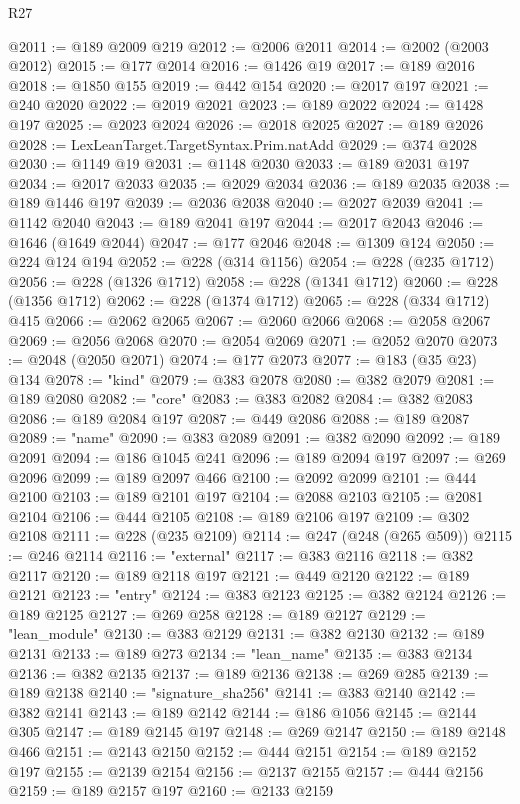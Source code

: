 \begin{lexlean}{R27}
\begin{coremodule}
@2011 := @189 @2009 @219
@2012 := @2006 @2011
@2014 := @2002 (@2003 @2012)
@2015 := @177 @2014
@2016 := @1426 @19
@2017 := @189 @2016
@2018 := @1850 @155
@2019 := @442 @154
@2020 := @2017 @197
@2021 := @240 @2020
@2022 := @2019 @2021
@2023 := @189 @2022
@2024 := @1428 @197
@2025 := @2023 @2024
@2026 := @2018 @2025
@2027 := @189 @2026
@2028 := LexLeanTarget.TargetSyntax.Prim.natAdd
@2029 := @374 @2028
@2030 := @1149 @19
@2031 := @1148 @2030
@2033 := @189 @2031 @197
@2034 := @2017 @2033
@2035 := @2029 @2034
@2036 := @189 @2035
@2038 := @189 @1446 @197
@2039 := @2036 @2038
@2040 := @2027 @2039
@2041 := @1142 @2040
@2043 := @189 @2041 @197
@2044 := @2017 @2043
@2046 := @1646 (@1649 @2044)
@2047 := @177 @2046
@2048 := @1309 @124
@2050 := @224 @124 @194
@2052 := @228 (@314 @1156)
@2054 := @228 (@235 @1712)
@2056 := @228 (@1326 @1712)
@2058 := @228 (@1341 @1712)
@2060 := @228 (@1356 @1712)
@2062 := @228 (@1374 @1712)
@2065 := @228 (@334 @1712) @415
@2066 := @2062 @2065
@2067 := @2060 @2066
@2068 := @2058 @2067
@2069 := @2056 @2068
@2070 := @2054 @2069
@2071 := @2052 @2070
@2073 := @2048 (@2050 @2071)
@2074 := @177 @2073
@2077 := @183 (@35 @23) @134
@2078 := "kind"
@2079 := @383 @2078
@2080 := @382 @2079
@2081 := @189 @2080
@2082 := "core"
@2083 := @383 @2082
@2084 := @382 @2083
@2086 := @189 @2084 @197
@2087 := @449 @2086
@2088 := @189 @2087
@2089 := "name"
@2090 := @383 @2089
@2091 := @382 @2090
@2092 := @189 @2091
@2094 := @186 @1045 @241
@2096 := @189 @2094 @197
@2097 := @269 @2096
@2099 := @189 @2097 @466
@2100 := @2092 @2099
@2101 := @444 @2100
@2103 := @189 @2101 @197
@2104 := @2088 @2103
@2105 := @2081 @2104
@2106 := @444 @2105
@2108 := @189 @2106 @197
@2109 := @302 @2108
@2111 := @228 (@235 @2109)
@2114 := @247 (@248 (@265 @509))
@2115 := @246 @2114
@2116 := "external"
@2117 := @383 @2116
@2118 := @382 @2117
@2120 := @189 @2118 @197
@2121 := @449 @2120
@2122 := @189 @2121
@2123 := "entry"
@2124 := @383 @2123
@2125 := @382 @2124
@2126 := @189 @2125
@2127 := @269 @258
@2128 := @189 @2127
@2129 := "lean_module"
@2130 := @383 @2129
@2131 := @382 @2130
@2132 := @189 @2131
@2133 := @189 @273
@2134 := "lean_name"
@2135 := @383 @2134
@2136 := @382 @2135
@2137 := @189 @2136
@2138 := @269 @285
@2139 := @189 @2138
@2140 := "signature_sha256"
@2141 := @383 @2140
@2142 := @382 @2141
@2143 := @189 @2142
@2144 := @186 @1056
@2145 := @2144 @305
@2147 := @189 @2145 @197
@2148 := @269 @2147
@2150 := @189 @2148 @466
@2151 := @2143 @2150
@2152 := @444 @2151
@2154 := @189 @2152 @197
@2155 := @2139 @2154
@2156 := @2137 @2155
@2157 := @444 @2156
@2159 := @189 @2157 @197
@2160 := @2133 @2159

\end{coremodule}
\end{lexlean}
